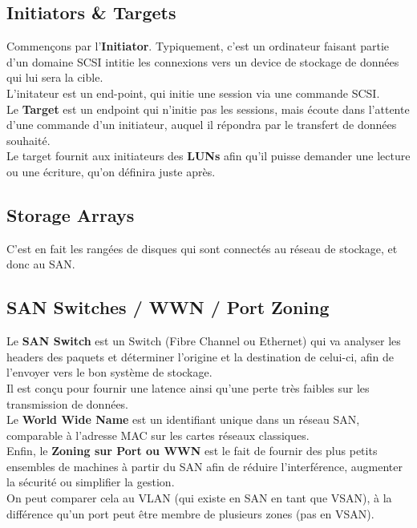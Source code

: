 \documentclass{report}
\begin{document}
		\subsection{Initiators \& Targets}

			Commençons par l'\textbf{Initiator}. Typiquement, c'est un ordinateur faisant partie d'un domaine SCSI intitie les connexions vers un device de stockage de données qui lui sera la cible.\\
			L'initateur est un end-point, qui initie une session via une commande SCSI.\\

			Le \textbf{Target} est un endpoint qui n'initie pas les sessions, mais écoute dans l'attente d'une commande d'un initiateur, auquel il répondra par le transfert de données souhaité.\\
			Le target fournit aux initiateurs des \textbf{LUNs} afin qu'il puisse demander une lecture ou une écriture, qu'on définira juste après.\\

		\subsection{Storage Arrays}

			C'est en fait les rangées de disques qui sont connectés au réseau de stockage, et donc au SAN.

		\subsection{SAN Switches / WWN / Port Zoning}

			Le \textbf{SAN Switch} est un Switch (Fibre Channel ou Ethernet) qui va analyser les headers des paquets et déterminer l'origine et la destination de celui-ci, afin de l'envoyer vers le bon système de stockage.\\
			Il est conçu pour fournir une latence ainsi qu'une perte très faibles sur les transmission de données.\\

			Le \textbf{World Wide Name} est un identifiant unique dans un réseau SAN, comparable à l'adresse MAC sur les cartes réseaux classiques.\\

			Enfin, le \textbf{Zoning sur Port ou WWN} est le fait de fournir des plus petits ensembles de machines à partir du SAN afin de réduire l'interférence, augmenter la sécurité ou simplifier la gestion.\\
			On peut comparer cela au VLAN (qui existe en SAN en tant que VSAN), à la différence qu'un port peut être membre de plusieurs zones (pas en VSAN).\\
\end{document}
